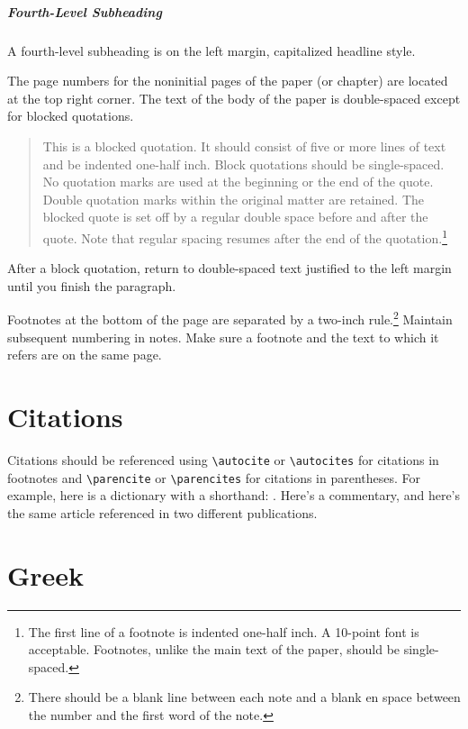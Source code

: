\documentclass[letterpaper,12pt]{article}
\newif\ifxetexorluatex
\begin{document}
\subparagraph{Fourth-Level Subheading}

A fourth-level subheading is on the left margin, capitalized headline style.

The page numbers for the noninitial pages of the paper (or chapter) are
located at the top right corner. The text of the body of the paper is
double-spaced except for blocked
quotations.
\begin{quote}
  This is a blocked quotation. It should consist of five or more lines of text
  and be indented one-half inch. Block quotations should be single-spaced. No
  quotation marks are used at the beginning or the end of the quote. Double
  quotation marks within the original matter are retained. The blocked quote
  is set off by a regular double space before and after the quote. Note that
  regular spacing resumes after the end of the quotation.\footnote{The first
  line of a footnote is indented one-half inch. A 10-point font is acceptable.
  Footnotes, unlike the main text of the paper, should be single-spaced.}
\end{quote}
After a block quotation, return to double-spaced text justified to the left
margin until you finish the paragraph.

%
Footnotes at the bottom of the page are separated by a two-inch
rule.\footnote{There should be a blank line between each note and a blank en
space between the number and the first word of the note.} Maintain subsequent
numbering in notes. Make sure a footnote and the text to which it refers are
on the same page.

\section{Citations}

%
Citations should be referenced using \verb+\autocite+ or \verb+\autocites+ for
citations in footnotes and \verb+\parencite+ or \verb+\parencites+ for
citations in parentheses. For example, here is a dictionary with a shorthand:
\parencite{NIDNTT}. Here's a commentary,\autocite{dahood:1965-1970} and here's
the same article referenced in two different
publications.\autocites{freedman:1977,freedman:1980}

\section{Greek\ifxetexorluatex{} and Hebrew\fi}
\end{document}
